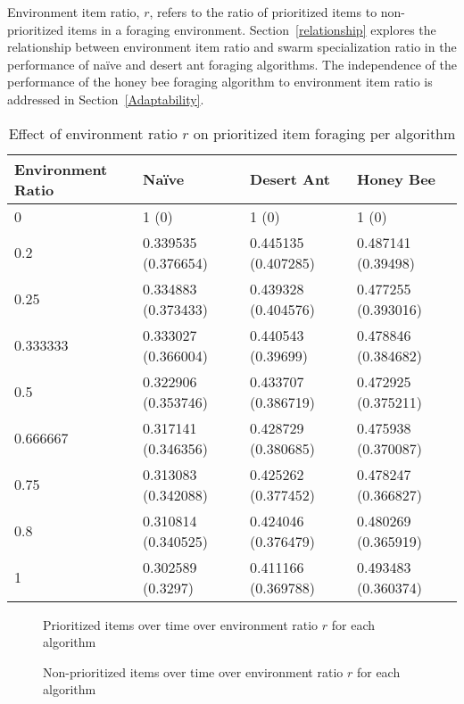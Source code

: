 Environment item ratio, $r$, refers to the ratio of prioritized items to non-prioritized items in a foraging environment. 
Section~\ref{relationship} explores the relationship between environment item ratio and swarm specialization ratio in the performance of na\"ive and desert ant foraging algorithms. The independence of the performance of the honey bee foraging algorithm to environment item ratio is addressed in Section~\ref{Adaptability}.


\begin{table} [h]
    \caption{Effect of environment ratio $r$ on prioritized item foraging per algorithm}
    \label{generalratio}
	\centering
	\footnotesize
	\begin{tabular} {|l|l|l|l|}
		\hline
		Environment Ratio & Na\"ive & Desert Ant & Honey Bee \\
		\hline
		0 & 1 (0)  & 1 (0)  & 1 (0)  \\
		0.2 & 0.339535 (0.376654)  & 0.445135 (0.407285)  & 0.487141 (0.39498)  \\
		0.25 & 0.334883 (0.373433)  & 0.439328 (0.404576)  & 0.477255 (0.393016)  \\
		0.333333 & 0.333027 (0.366004)  & 0.440543 (0.39699)  & 0.478846 (0.384682)  \\
		0.5 & 0.322906 (0.353746)  & 0.433707 (0.386719)  & 0.472925 (0.375211)  \\
		0.666667 & 0.317141 (0.346356)  & 0.428729 (0.380685)  & 0.475938 (0.370087)  \\
		0.75 & 0.313083 (0.342088)  & 0.425262 (0.377452)  & 0.478247 (0.366827)  \\
		0.8 & 0.310814 (0.340525)  & 0.424046 (0.376479)  & 0.480269 (0.365919)  \\
		1 & 0.302589 (0.3297)  & 0.411166 (0.369788)  & 0.493483 (0.360374)  \\
		\hline
	\end{tabular}
\end{table}


\begin{figure}[!htb]
\centering
\resizebox{\textwidth}{!}{}
\caption{Prioritized items over time over environment ratio $r$ for each algorithm }
\label{ratiogoldplot}
\end{figure}


\begin{figure}[!htb]
\centering
\resizebox{\textwidth}{!}{}
\caption{Non-prioritized items over time over environment ratio $r$ for each algorithm}
\label{ratiowasteplot}
\end{figure}


